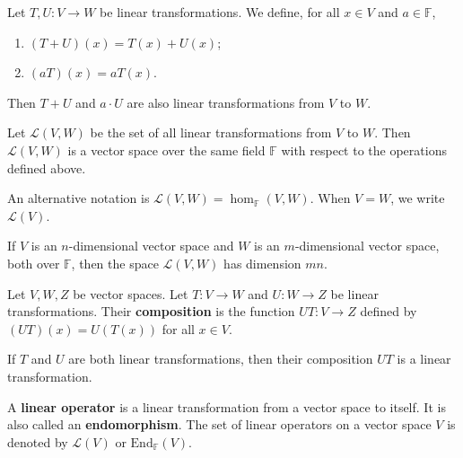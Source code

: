 \begin{theorem}
	Let $T, U : V \longrightarrow W$ be linear transformations. We define, for all $x \in V$ and $a \in \mathbb{F}$,
	\begin{enumerate}
		\item $(T+U)(x) = T(x) + U(x)$;
		\item $(aT)(x) = aT(x)$.
	\end{enumerate}

	Then $T+U$ and $a\cdot U$ are also linear transformations from $V$ to $W$.
\end{theorem}

\begin{theorem}
	Let $\mathcal{L}(V,W)$ be the set of all linear transformations from $V$ to $W$. Then $\mathcal{L}(V,W)$ is a vector space over the same field $\mathbb{F}$ with respect to the operations defined above.

	An alternative notation is $\mathcal{L}(V,W) = \hom_{\mathbb{F}}(V,W)$. When $V = W$, we write $\mathcal{L}(V)$.
\end{theorem}

\begin{theorem}
	If $V$ is an $n$-dimensional vector space and $W$ is an $m$-dimensional vector space, both over $\mathbb{F}$, then the space $\mathcal{L}(V,W)$ has dimension $mn$.
\end{theorem}


\begin{definition}
	Let $V, W, Z$ be vector spaces. Let $T : V \longrightarrow W$ and $U : W \longrightarrow Z$ be linear transformations. Their \textbf{composition} is the function $UT : V \longrightarrow Z$ defined by $(UT)(x) = U(T(x))$ for all $x \in V$.
\end{definition}

\begin{theorem}
	If $T$ and $U$ are both linear transformations, then their composition $UT$ is a linear transformation.
\end{theorem}

\begin{definition}
	A \textbf{linear operator} is a linear transformation from a vector space to itself. It is also called an \textbf{endomorphism}. The set of linear operators on a vector space $V$ is denoted by $\mathcal{L}(V)$ or $\text{End}_{\mathbb{F}} (V)$.
\end{definition}

